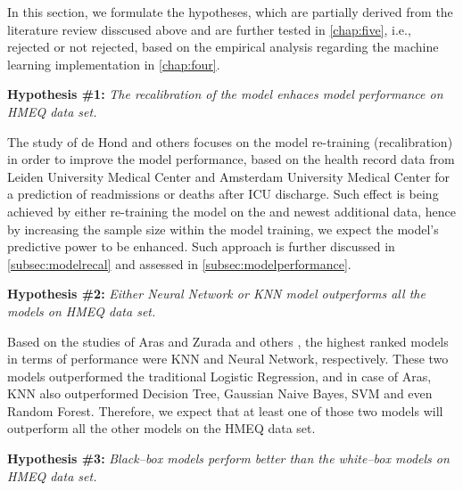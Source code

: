 In this section, we formulate the hypotheses, which are partially derived from the literature review disscused above and are further tested in \autoref{chap:five}, i.e., rejected or not rejected, based on the empirical analysis regarding the machine learning implementation in \autoref{chap:four}.
\vspace{0.5cm}

\noindent \textbf{Hypothesis \#1:} \textit{The recalibration of the model enhaces model performance on HMEQ data set.}

The study of de Hond and others \citep{de2023predicting} focuses on the model re-training (recalibration) in order to improve the model performance, based on the health record data from Leiden University Medical Center and Amsterdam University Medical Center for a prediction of readmissions or deaths after ICU discharge.
Such effect is being achieved by either re-training the model on the and newest additional data, hence by increasing the sample size within the model training, we expect the model's predictive power to be enhanced. Such approach is further discussed in \autoref{subsec:modelrecal} and assessed in \autoref{subsec:modelperformance}.
\vspace{0.5cm}


\noindent \textbf{Hypothesis \#2:} \textit{Either Neural Network or KNN model outperforms all the models on HMEQ data set.}

Based on the studies of Aras \citep{serkan2021bagging} and Zurada and others \citep{zurada2014classification}, the highest ranked models in terms of performance were KNN and Neural Network, respectively. These two models outperformed the traditional Logistic Regression, and in case of Aras, KNN also outperformed Decision Tree, Gaussian Naive Bayes, SVM and even Random Forest.
Therefore, we expect that at least one of those two models will outperform all the other models on the HMEQ data set.

\vspace{0.5cm}

\noindent \textbf{Hypothesis \#3:} \textit{Black--box models perform better than the white--box models on HMEQ data set.}

